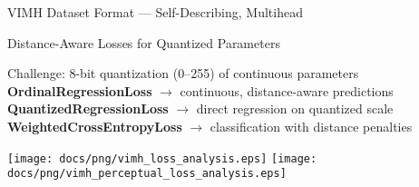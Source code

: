 \begin{slide}[\slideopts,toc={VIMH Format}]{VIMH Dataset Format --- Self-Describing, Multihead}
\begin{center}
    
\end{center}
\end{slide}

\begin{slide}[\slideopts,toc={Losses}]{Distance-Aware Losses for Quantized Parameters}
  \vspace{-0.75em}
  \begin{itemize}
    \mpitem Challenge: 8-bit quantization (0--255) of continuous parameters
    \mpitem \textbf{OrdinalRegressionLoss} $\to$ continuous, distance-aware predictions
    \mpitem \textbf{QuantizedRegressionLoss} $\to$ direct regression on quantized scale
    \mpitem \textbf{WeightedCrossEntropyLoss} $\to$ classification with distance penalties
  \end{itemize}
  \vspace{-0.5em}
  \begin{center}
    \texttt{[image: docs/png/vimh\_loss\_analysis.eps]}\hspace{0.02\linewidth}
    \texttt{[image: docs/png/vimh\_perceptual\_loss\_analysis.eps]}
\end{center}
\end{slide}


